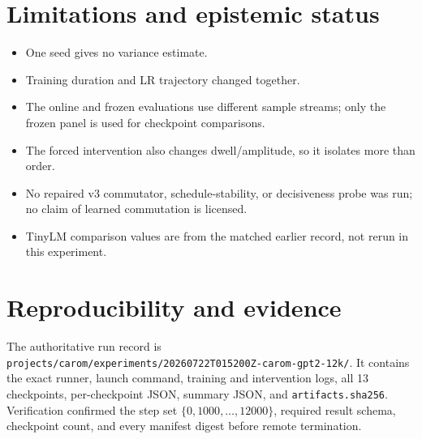 \documentclass[10pt]{article}
\begin{document}
\section{Limitations and epistemic status}
\begin{itemize}
\item One seed gives no variance estimate.
\item Training duration and LR trajectory changed together.
\item The online and frozen evaluations use different sample streams; only the
frozen panel is used for checkpoint comparisons.
\item The forced intervention also changes dwell/amplitude, so it isolates more
than order.
\item No repaired v3 commutator, schedule-stability, or decisiveness probe was
run; no claim of learned commutation is licensed.
\item TinyLM comparison values are from the matched earlier record, not rerun
in this experiment.
\end{itemize}

\section{Reproducibility and evidence}
The authoritative run record is
\texttt{projects/carom/experiments/20260722T015200Z-carom-gpt2-12k/}.
It contains the exact runner, launch command, training and intervention logs,
all 13 checkpoints, per-checkpoint JSON, summary JSON, and
\texttt{artifacts.sha256}. Verification confirmed the step set
$\{0,1000,\ldots,12000\}$, required result schema, checkpoint count, and every
manifest digest before remote termination.
\end{document}
